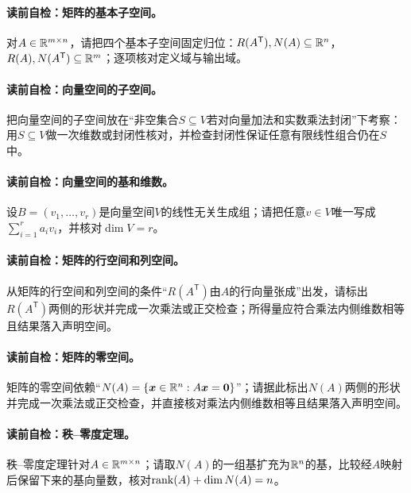 \paragraph{读前自检：矩阵的基本子空间。}对$A\in\mathbb{R}^{m\times n}$，请把四个基本子空间固定归位：$R(A^{\mathsf T}),N(A)\subseteq\mathbb{R}^n$，$R(A),N(A^{\mathsf T})\subseteq\mathbb{R}^m$；逐项核对定义域与输出域。\par
\paragraph{读前自检：向量空间的子空间。}把向量空间的子空间放在“非空集合$S\subseteq V$若对向量加法和实数乘法封闭”下考察：用$S\subseteq V$做一次维数或封闭性核对，并检查封闭性保证任意有限线性组合仍在$S$中。\par
\paragraph{读前自检：向量空间的基和维数。}设$B=(v_1,\ldots,v_r)$是向量空间$V$的线性无关生成组；请把任意$v\in V$唯一写成$\sum_{i=1}^r a_iv_i$，并核对$\dim V=r$。\par
\paragraph{读前自检：矩阵的行空间和列空间。}从矩阵的行空间和列空间的条件“$R(A^{\mathsf T})$由$A$的行向量张成”出发，请标出$R(A^{\mathsf T})$两侧的形状并完成一次乘法或正交检查；所得量应符合乘法内侧维数相等且结果落入声明空间。\par
\paragraph{读前自检：矩阵的零空间。}矩阵的零空间依赖“$N(A)=\{\boldsymbol{x}\in\mathbb{R}^n:A\boldsymbol{x}=\boldsymbol0\}$”；请据此标出$N(A)$两侧的形状并完成一次乘法或正交检查，并直接核对乘法内侧维数相等且结果落入声明空间。\par
\paragraph{读前自检：秩--零度定理。}秩--零度定理针对$A\in\mathbb{R}^{m\times n}$；请取$N(A)$的一组基扩充为$\mathbb{R}^n$的基，比较经$A$映射后保留下来的基向量数，核对$\operatorname{rank}(A)+\dim N(A)=n$。\par

